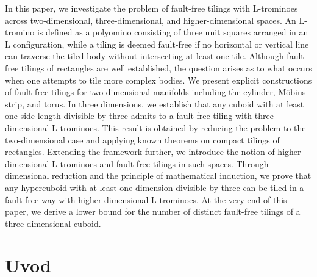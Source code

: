 \begin{AbstractEng}
In this paper, we investigate the problem of fault-free tilings with L-trominoes across two-dimensional, three-dimensional, and higher-dimensional spaces. An L-tromino is defined as a polyomino consisting of three unit squares arranged in an L configuration, while a tiling is deemed fault-free if no horizontal or vertical line can traverse the tiled body without intersecting at least one tile. Although fault-free tilings of rectangles are well established, the question arises as to what occurs when one attempts to tile more complex bodies.
We present explicit constructions of fault-free tilings for two-dimensional manifolds including the cylinder, Möbius strip, and torus. In three dimensions, we establish that any cuboid with at least one side length divisible by three admits to a fault-free tiling with three-dimensional L-trominoes. This result is obtained by reducing the problem to the two-dimensional case and applying known theorems on compact tilings of rectangles. Extending the framework further, we introduce the notion of higher-dimensional L-trominoes and fault-free tilings in such spaces. Through dimensional reduction and the principle of mathematical induction, we prove that any hypercuboid with at least one dimension divisible by three can be tiled in a fault-free way with higher-dimensional L-trominoes.
At the very end of this paper, we derive a lower bound for the number of distinct fault-free tilings of a three-dimensional cuboid.



\end{AbstractEng}
\StartDoublePaper
\label{doc:rad}

\AuthorExHere
\section{Uvod}

